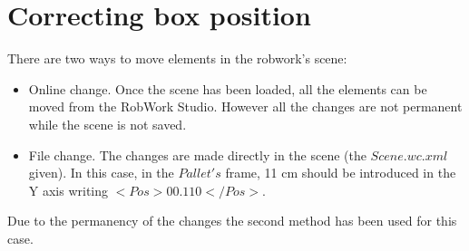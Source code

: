 \chapter{Correcting box position} %
\label{chap:1}
There are two ways to move elements in the robwork's scene:
\begin{itemize}
	\item Online change. Once the scene has been loaded, all the elements can be moved from the RobWork Studio. However all the changes are not permanent while the scene is not saved.
	\item File change. The changes are made directly in the scene (the $Scene.wc.xml$ given). In this case, in the $Pallet's$ frame, 11 cm should be introduced in the Y axis writing $<Pos> 0 0.11 0 </Pos>$.
\end{itemize}

Due to the permanency of the changes the second method has been used for this case.

